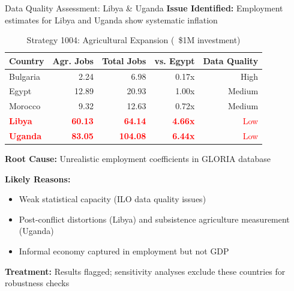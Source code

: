 \documentclass[10pt]{beamer}
\begin{document}
\begin{frame}{Data Quality Assessment: Libya \& Uganda}
\textbf{Issue Identified:} Employment estimates for Libya and Uganda show systematic inflation

\vspace{0.4cm}

\begin{table}[]
\centering
\footnotesize
\begin{tabular}{@{}lrrrr@{}}
\toprule
\textbf{Country} & \textbf{Agr. Jobs} & \textbf{Total Jobs} & \textbf{vs. Egypt} & \textbf{Data Quality} \\ \midrule
Bulgaria & 2.24 & 6.98 & 0.17x & High \\
Egypt & 12.89 & 20.93 & 1.00x & Medium \\
Morocco & 9.32 & 12.63 & 0.72x & Medium \\ \midrule
\textcolor{red}{\textbf{Libya}} & \textcolor{red}{\textbf{60.13}} & \textcolor{red}{\textbf{64.14}} & \textcolor{red}{\textbf{4.66x}} & \textcolor{red}{Low} \\
\textcolor{red}{\textbf{Uganda}} & \textcolor{red}{\textbf{83.05}} & \textcolor{red}{\textbf{104.08}} & \textcolor{red}{\textbf{6.44x}} & \textcolor{red}{Low} \\ \bottomrule
\end{tabular}
\caption{Strategy 1004: Agricultural Expansion (~\$1M investment)}
\end{table}

\vspace{0.3cm}

\textbf{Root Cause:} Unrealistic employment coefficients in GLORIA database

\vspace{0.2cm}

\textbf{Likely Reasons:}
\begin{itemize}
    \item Weak statistical capacity (ILO data quality issues)
    \item Post-conflict distortions (Libya) and subsistence agriculture measurement (Uganda)
    \item Informal economy captured in employment but not GDP
\end{itemize}

\vspace{0.2cm}

\textbf{Treatment:} Results flagged; sensitivity analyses exclude these countries for robustness checks
\end{frame}
\end{document}
